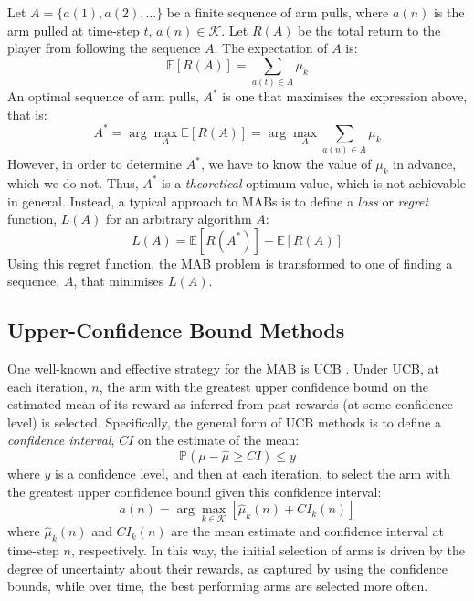 \documentclass[runningheads, envcountsame, a4paper]{llncs}
\begin{document}
Let $A  = \{a(1), a(2), \ldots \}$ be a finite sequence of arm pulls, where $a(n)$ is the arm pulled at time-step $t$, $a(n)\in \mathcal{K}$.
Let $R(A)$ be the total return to the player from following the sequence $A$.
The expectation of $A$ is:
\[
\mathbb{E}\left[ R(A) \right] = \sum_{a(t) \in A} \mu_k
\]
An optimal sequence of arm pulls, $A^*$ is one that maximises the expression above, that is:
\[
A^* = \arg\max_{A} \mathbb{E}\left[ R(A) \right] 
    = \arg\max_{A} \sum_{a(n) \in A} \mu_k
\]
However, in order to determine $A^*$, we have to know the value of $\mu_k$ in advance, which we do not.
Thus, $A^*$ is a \textit{theoretical} optimum value, which is
not achievable in general.
Instead, a typical approach to MABs is to define a \textit{loss} or \textit{regret} function, $L(A)$ for an arbitrary algorithm $A$:
\begin{equation}
\label{eqn:regret}
L(A) = \mathbb{E}\left[ R(A^*) \right] - \mathbb{E}\left[ R(A) \right]
\end{equation}
Using this regret function, the MAB problem is transformed to one of finding a sequence, $A$, that minimises $L(A)$.


\subsection{Upper-Confidence Bound Methods}
One well-known and effective strategy for the MAB is UCB \cite{Lai_1985}.
Under UCB, at each iteration, $n$, the arm with the greatest upper confidence bound on the estimated mean of its reward as inferred from past rewards (at some confidence level) is selected.
Specifically, the general form of UCB methods is to define a \textit{confidence interval}, $CI$ on the estimate of the mean:
\[
\mathbb{P}\left(\mu - \hat{\mu} \ge CI \right) \le y
\]
where $y$ is a confidence level,  
and then at each iteration, to select the arm with the greatest upper confidence bound given this confidence interval:
\[
a(n) = \arg\max_{k\in \mathcal{K}} 
\left[ \hat{\mu}_k(n) + CI_k (n) \right]
\]
where $\hat{\mu}_k(n)$ and $ CI_k(n)$ are the mean estimate and confidence interval at time-step $n$, respectively.
In this way, the initial selection of arms is driven by the degree of uncertainty about their rewards, as captured by using the confidence bounds, while over time, the best performing arms are selected more often.
\end{document}
